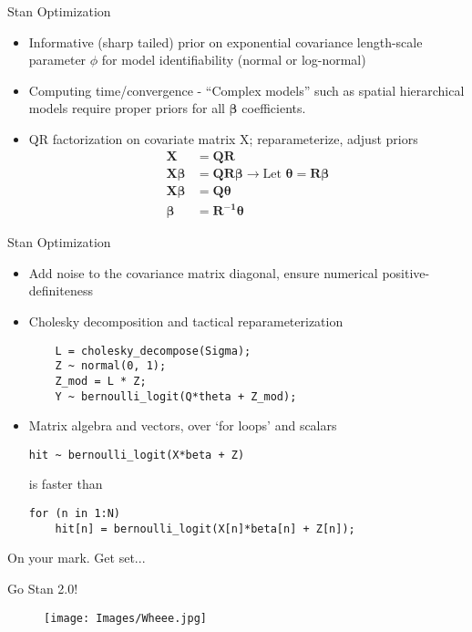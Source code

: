 \documentclass{beamer}
\begin{document}
\begin{frame}[fragile]{Stan Optimization}{}
\begin{itemize}
\addtolength{\itemsep}{0.5\baselineskip}
\item Informative (sharp tailed) prior on exponential covariance length-scale parameter $\phi$ for model identifiability (normal or log-normal)
\item Computing time/convergence - ``Complex models'' such as spatial hierarchical models require proper priors for all $\pmb{\beta}$ coefficients.
\item QR factorization on covariate matrix X; reparameterize, adjust priors
\begin{align*}
\pmb{X} &= \pmb{QR} \\
\pmb{X \beta} &= \pmb{QR \beta} \rightarrow \text{Let } \pmb{\theta} = \pmb{R \beta} \\
\pmb{X \beta} &= \pmb{Q \theta} \\
\pmb{\beta} &= \pmb{R^{-1}\theta}
\end{align*}
\end{itemize}
\end{frame}

\begin{frame}[fragile]{Stan Optimization}{}
\begin{itemize}
\addtolength{\itemsep}{0.5\baselineskip}
\item Add noise to the covariance matrix diagonal, ensure numerical positive-definiteness
\item Cholesky decomposition and tactical reparameterization 
    \begin{verbatim}
    L = cholesky_decompose(Sigma);
    Z ~ normal(0, 1);
    Z_mod = L * Z;
    Y ~ bernoulli_logit(Q*theta + Z_mod);
    \end{verbatim}
\item Matrix algebra and vectors, over ‘for loops’ and scalars
\begin{verbatim}
hit ~ bernoulli_logit(X*beta + Z)
\end{verbatim}
is faster than
\begin{verbatim}
for (n in 1:N)
    hit[n] = bernoulli_logit(X[n]*beta[n] + Z[n]);
\end{verbatim}
\end{itemize}
On your mark. Get set...
\end{frame}

\begin{frame}{Go Stan 2.0!}

  \begin{figure}[H]
	\centering
	\texttt{[image: Images/Wheee.jpg]}
	\end{figure}

\end{frame}
\end{document}
